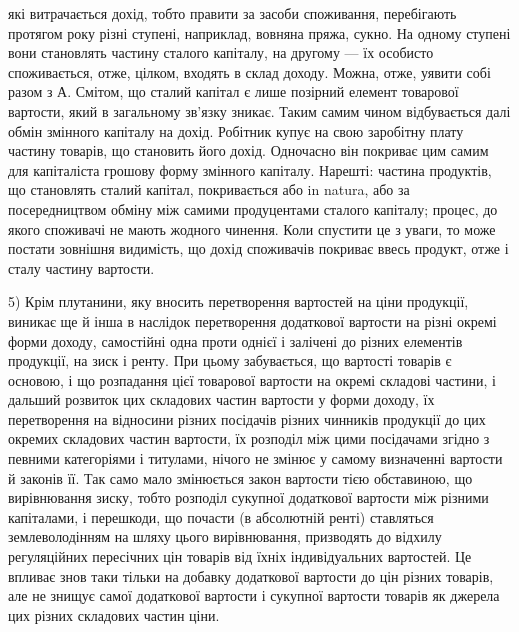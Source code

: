 \parcont{}  %
які витрачається дохід, тобто правити за засоби споживання, перебігають протягом
року різні ступені, наприклад, вовняна пряжа, сукно. На одному ступені
вони становлять частину сталого капіталу, на другому — їх особисто споживається,
отже, цілком, входять в склад доходу. Можна, отже, уявити собі разом
з А. Смітом, що сталий капітал є лише позірний елемент товарової вартости,
який в загальному зв’язку зникає. Таким самим чином відбувається далі обмін
змінного капіталу на дохід. Робітник купує на свою заробітну плату частину
товарів, що становить його дохід. Одночасно він покриває цим самим для капіталіста
грошову форму змінного капіталу. Нарешті: частина продуктів, що становлять
сталий капітал, покривається або in natura, або за посередництвом обміну
між самими продуцентами сталого капіталу; процес, до якого споживачі
не мають жодного чинення. Коли спустити це з уваги, то може постати зовнішня
видимість, що дохід споживачів покриває ввесь продукт, отже і сталу частину
вартости.

5) Крім плутанини, яку вносить перетворення вартостей на ціни продукції,
виникає ще й інша в наслідок перетворення додаткової вартости на різні окремі
форми доходу, самостійні одна проти однієї і залічені до різних елементів продукції,
на зиск і ренту. При цьому забувається, що вартості товарів є основою, і що
розпадання цієї товарової вартости на окремі складові частини, і дальший розвиток
цих складових частин вартости у форми доходу, їх перетворення на відносини
різних посідачів різних чинників продукції до цих окремих складових
частин вартости, їх розподіл між цими посідачами згідно з певними категоріями
і титулами, нічого не змінює у самому визначенні вартости й законів її.
Так само мало змінюється закон вартости тією обставиною, що вирівнювання
зиску, тобто розподіл сукупної додаткової вартости між різними капіталами, і
перешкоди, що почасти (в абсолютній ренті) ставляться землеволодінням на
шляху цього вирівнювання, призводять до відхилу регуляційних пересічних цін
товарів від їхніх індивідуальних вартостей. Це впливає знов таки тільки на
добавку додаткової вартости до цін різних товарів, але не знищує самої додаткової
вартости і сукупної вартости товарів як джерела цих різних складових
частин ціни.

